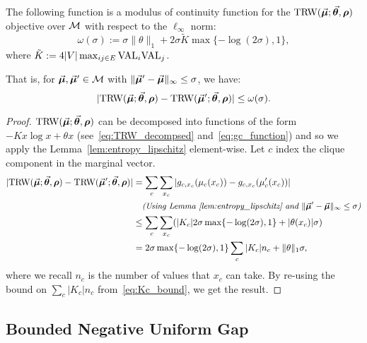 \begin{lemma}
  \label{lem:trw_obj_weak_lipschitz}
  The following function is a modulus of continuity function for the $\text{TRW}(\vec{\bm{\mu}};\vec{\bm{\theta}},\bm{\rho})$ objective over $\mathcal{M}$ with respect to the $\ell_\infty$ norm:
  \begin{equation}
   \omega(\sigma) := \sigma\| \theta \|_1 + 2 \sigma \tilde{K} \max\{-\log(2\sigma),1\},
   \end{equation}
   where $\tilde{K} := 4 |V| \max_{ij \in E} \textrm{VAL}_i \textrm{VAL}_j$.
   
   That is, for $\vec{\bm{\mu}}, \vec{\bm{\mu}}' \in \mathcal{M}$ with $\| \vec{\bm{\mu}}' - \vec{\bm{\mu}} \|_\infty \leq \sigma$, we have:
   $$ | \text{TRW}(\vec{\bm{\mu}};\vec{\bm{\theta}},\bm{\rho}) - \text{TRW}(\vec{\bm{\mu}}';\vec{\bm{\theta}},\bm{\rho}) | \leq \omega(\sigma) .$$
\end{lemma}
\begin{proof}
%
%
$\text{TRW}(\vec{\bm{\mu}};\vec{\bm{\theta}},\bm{\rho})$ can be decomposed into 
functions of the form $-Kx\log x + \theta x$ (see~\eqref{eq:TRW_decompsed} and~\eqref{eq:gc_function}) and so we apply the Lemma~\ref{lem:entropy_lipschitz} element-wise. Let $c$ index the clique component in the marginal vector. 
\begin{align*}
	| \text{TRW}(\vec{\bm{\mu}};\vec{\bm{\theta}},\bm{\rho}) - \text{TRW}(\vec{\bm{\mu}}';\vec{\bm{\theta}},\bm{\rho}) | &= 
	\sum_c \sum_{x_c} | g_{c,x_c}(\mu_c(x_c)) - g_{c,x_c}(\mu'_c(x_c))| \\
	&\quad\emph{\small{(Using Lemma \ref{lem:entropy_lipschitz} and $\| \vec{\bm{\mu}}' - \vec{\bm{\mu}} \|_\infty \leq \sigma$)}}\\
	&\leq \sum_c \sum_{x_c} (|K_c|2 \sigma  \max\{- \log (2\sigma), 1\} + |\theta(x_c)|\sigma )\\
	&= 2\sigma  \max\{- \log (2\sigma), 1\} \sum_c |K_c|n_c +\|\theta\|_1\sigma,
\end{align*}
where we recall $n_c$ is the number of values that $x_c$ can take. By re-using the bound on $\sum_c |K_c| n_c$ from~\eqref{eq:Kc_bound}, we get the result.
\end{proof}


\subsection{Bounded Negative Uniform Gap} \label{sec:trw_bounded_unif}
%

%
%
%
%
%

